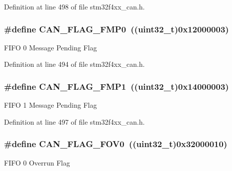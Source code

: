 Definition at line 498 of file stm32f4xx\-\_\-can.\-h.

\hypertarget{group___c_a_n__flags_ga4b40574700edfe752433bb4e0d457c64}{
\subsubsection[{C\-A\-N\-\_\-\-F\-L\-A\-G\-\_\-\-F\-M\-P0}]{\setlength{\rightskip}{0pt plus 5cm}\#define C\-A\-N\-\_\-\-F\-L\-A\-G\-\_\-\-F\-M\-P0~((uint32\-\_\-t)0x12000003)}}\label{group___c_a_n__flags_ga4b40574700edfe752433bb4e0d457c64}
F\-I\-F\-O 0 Message Pending Flag 

Definition at line 494 of file stm32f4xx\-\_\-can.\-h.

\hypertarget{group___c_a_n__flags_ga5d4b7376954a059fbd74ed8d688f6657}{
\subsubsection[{C\-A\-N\-\_\-\-F\-L\-A\-G\-\_\-\-F\-M\-P1}]{\setlength{\rightskip}{0pt plus 5cm}\#define C\-A\-N\-\_\-\-F\-L\-A\-G\-\_\-\-F\-M\-P1~((uint32\-\_\-t)0x14000003)}}\label{group___c_a_n__flags_ga5d4b7376954a059fbd74ed8d688f6657}
F\-I\-F\-O 1 Message Pending Flag 

Definition at line 497 of file stm32f4xx\-\_\-can.\-h.

\hypertarget{group___c_a_n__flags_ga2abd66b5e0032132673208decd2d01f2}{
\subsubsection[{C\-A\-N\-\_\-\-F\-L\-A\-G\-\_\-\-F\-O\-V0}]{\setlength{\rightskip}{0pt plus 5cm}\#define C\-A\-N\-\_\-\-F\-L\-A\-G\-\_\-\-F\-O\-V0~((uint32\-\_\-t)0x32000010)}}\label{group___c_a_n__flags_ga2abd66b5e0032132673208decd2d01f2}
F\-I\-F\-O 0 Overrun Flag 

